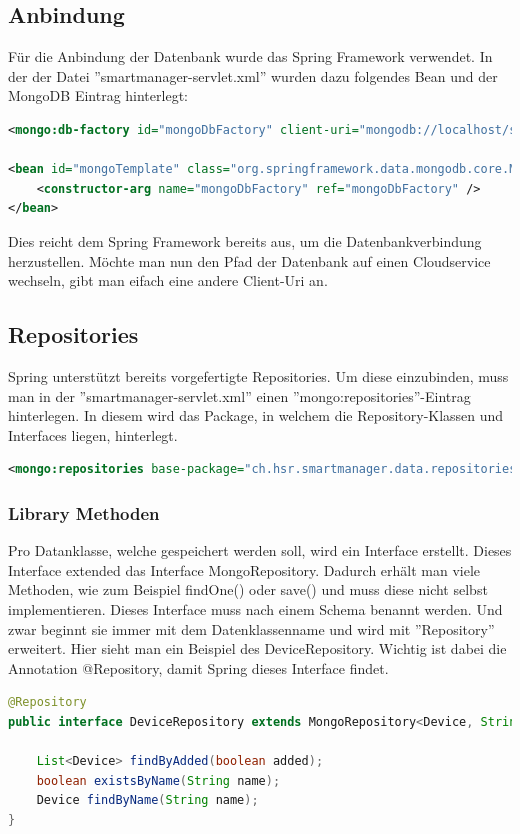 \subsection{Anbindung}
Für die Anbindung der Datenbank wurde das Spring Framework verwendet. In der der Datei ''smartmanager-servlet.xml'' wurden dazu folgendes Bean und der MongoDB Eintrag hinterlegt:
\begin{lstlisting}[language=xml]
<mongo:db-factory id="mongoDbFactory" client-uri="mongodb://localhost/smartmanager" />

<bean id="mongoTemplate" class="org.springframework.data.mongodb.core.MongoTemplate">
	<constructor-arg name="mongoDbFactory" ref="mongoDbFactory" />
</bean>
\end{lstlisting}
Dies reicht dem Spring Framework bereits aus, um die Datenbankverbindung herzustellen. Möchte man nun den Pfad der Datenbank auf einen Cloudservice wechseln, gibt man eifach eine andere Client-Uri an.

\subsection{Repositories}
Spring unterstützt bereits vorgefertigte Repositories. Um diese einzubinden, muss man in der ''smartmanager-servlet.xml'' einen ''mongo:repositories''-Eintrag hinterlegen. In diesem wird das Package, in welchem die Repository-Klassen und Interfaces liegen, hinterlegt.
\begin{lstlisting}[language=xml]
<mongo:repositories base-package="ch.hsr.smartmanager.data.repositories" />
\end{lstlisting}
\newpage

\subsubsection{Library Methoden}
Pro Datanklasse, welche gespeichert werden soll, wird ein Interface erstellt. Dieses Interface extended das Interface MongoRepository. Dadurch erhält man viele Methoden, wie zum Beispiel findOne() oder save() und muss diese nicht selbst implementieren. Dieses Interface muss nach einem Schema benannt werden. Und zwar beginnt sie immer mit dem Datenklassenname und wird mit ''Repository'' erweitert. Hier sieht man ein Beispiel des DeviceRepository. Wichtig ist dabei die Annotation @Repository, damit Spring dieses Interface findet. 
\begin{lstlisting}[language=java]
@Repository
public interface DeviceRepository extends MongoRepository<Device, String>, DeviceRepositoryCustom {
	
	List<Device> findByAdded(boolean added);
	boolean existsByName(String name);
	Device findByName(String name);
}
\end{lstlisting}

